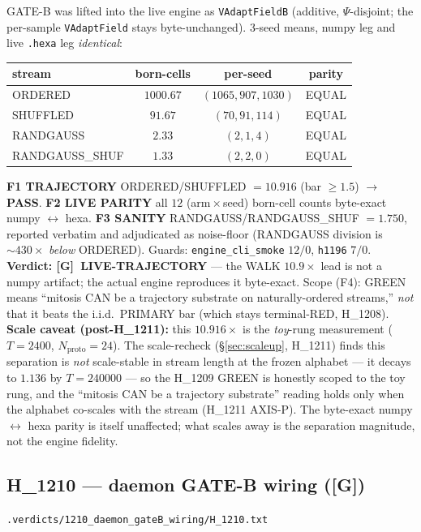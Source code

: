 \documentclass[11pt,a4paper]{article}
\providecommand{\tierGreen}{\textbf{[G]}}
\newcommand{\verdict}[1]{\texttt{\small #1}}
\begin{document}
GATE-B was lifted into the live engine as \verb|VAdaptFieldB| (additive,
$\Psi$-disjoint; the per-sample \verb|VAdaptField| stays byte-unchanged).
$3$-seed means, numpy leg and live \texttt{.hexa} leg \emph{identical}:
\begin{center}
\begin{tabular}{lccc}
\toprule
stream & born-cells & per-seed & parity \\
\midrule
ORDERED        & $1000.67$ & $(1065,907,1030)$ & EQUAL \\
SHUFFLED       & $91.67$   & $(70,91,114)$     & EQUAL \\
RANDGAUSS      & $2.33$    & $(2,1,4)$         & EQUAL \\
RANDGAUSS\_SHUF & $1.33$    & $(2,2,0)$         & EQUAL \\
\bottomrule
\end{tabular}
\end{center}
\textbf{F1 TRAJECTORY} ORDERED/SHUFFLED $=10.916$ (bar $\ge 1.5$) $\to$
\textbf{PASS}. \textbf{F2 LIVE PARITY} all $12$ (arm\,$\times$\,seed) born-cell
counts byte-exact numpy $\leftrightarrow$ hexa. \textbf{F3 SANITY}
RANDGAUSS/RANDGAUSS\_SHUF $=1.750$, reported verbatim and adjudicated as
noise-floor (RANDGAUSS division is $\sim 430\times$ \emph{below} ORDERED).
Guards: \verb|engine_cli_smoke| $12/0$, \verb|h1196| $7/0$. \textbf{Verdict:
\tierGreen\ LIVE-TRAJECTORY} --- the WALK $10.9\times$ lead is not a numpy
artifact; the actual engine reproduces it byte-exact. Scope (F4): GREEN means
``mitosis CAN be a trajectory substrate on naturally-ordered streams,''
\emph{not} that it beats the i.i.d.\ PRIMARY bar (which stays terminal-RED,
H\_1208). \textbf{Scale caveat (post-H\_1211):} this $10.916\times$ is the
\emph{toy}-rung measurement ($T{=}2400$, $N_{\text{proto}}{=}24$). The
scale-recheck (\S\ref{sec:scaleup}, H\_1211) finds this separation is \emph{not}
scale-stable in stream length at the frozen alphabet --- it decays to $1.136$ by
$T{=}240000$ --- so the H\_1209 GREEN is honestly scoped to the toy rung, and the
``mitosis CAN be a trajectory substrate'' reading holds only when the alphabet
co-scales with the stream (H\_1211 AXIS-P). The byte-exact numpy$\leftrightarrow$
hexa parity is itself unaffected; what scales away is the separation magnitude,
not the engine fidelity.

\subsection{H\_1210 --- daemon GATE-B wiring (\tierGreen)}
\noindent\verdict{.verdicts/1210\_daemon\_gateB\_wiring/H\_1210.txt}
\end{document}
